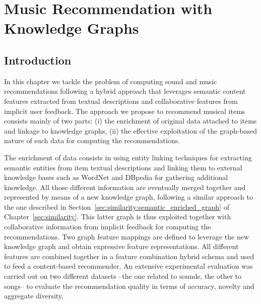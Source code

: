 
\chapter{Music Recommendation with Knowledge Graphs}
\label{sec:graph-rec}

\section{Introduction}
\label{sec:graph-rec:introduction}

In this chapter we tackle the problem of computing sound and music recommendations following a hybrid approach that leverages semantic content features extracted from textual descriptions and collaborative features from implicit user feedback. 
The approach we propose to recommend musical items consists mainly of two parts: (i) the enrichment of original data attached to items and linkage to knowledge graphs, (ii) the effective exploitation of the graph-based nature of such data for computing the recommendations. 

The enrichment of data consists in using entity linking techniques for extracting semantic entities from item textual descriptions and linking them to external knowledge bases such as WordNet \cite{wordnet} and DBpedia \cite{dbpedia1} for gathering additional knowledge. All those different information are eventually merged together and represented by means of a new knowledge graph, following a similar approach to the one described in Section~\ref{sec:similarity:semantic_enriched_graph} of Chapter~\ref{sec:similarity}.
This latter graph is thus exploited together with collaborative information from implicit feedback for computing the recommendations. Two graph feature mappings are defined to leverage the new knowledge graph and obtain expressive feature representations. All different features are combined together in a feature combination hybrid schema \cite{Burke2002} and used to feed a content-based recommender. An extensive experimental evaluation was carried out on two different datasets --the one related to sounds, the other to songs-- to evaluate the recommendation quality in terms of accuracy, novelty and aggregate diversity. 

